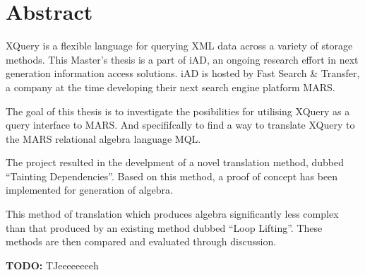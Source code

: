 \chapter*{Abstract}

XQuery is a flexible language for querying XML data across a variety of storage
methods. This Master's thesis is a part of iAD, an ongoing research effort in next generation information access
solutions. iAD is hosted by Fast Search \& Transfer, a company at the time developing their next search engine
platform MARS.

The goal of this thesis is to investigate the posibilities for utilising XQuery as a query interface to MARS. And
specififcally to find a way to translate XQuery to the MARS relational algebra language MQL.

The project resulted in the develpment of a novel translation method, dubbed ``Tainting Dependencies''.
Based on this method, a proof of concept has been implemented for generation of algebra.

This method of translation which produces algebra significantly less complex than that produced by an existing
method dubbed ``Loop Lifting''. These methods are then compared and evaluated through discussion.

\textbf{\LARGE TODO:} TJeeeeeeeeh
